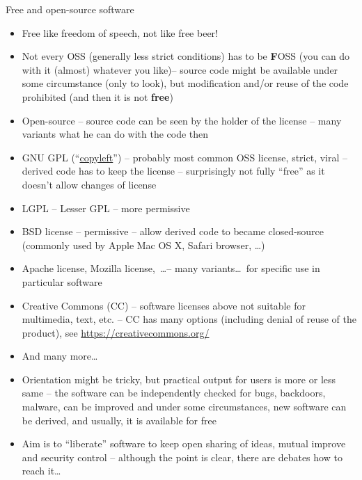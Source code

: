 \documentclass[compress, ucs, xelatex, 11pt, xcolor=svgnames,
  hyperref={
    bookmarks=true,
    unicode=true,
    colorlinks=true,
    pdftitle={Linux, command line and MetaCentrum},
    plainpages=false,
    pdfauthor={Vojtech Zeisek},
    pdfsubject={Course about use of Linux command line, writing shell scripts and using MetaCentrum of CESNET},
    pdfcreator={XeLaTeX},
    pdfkeywords={Linux, GNU, BASH, shell, command line, MetaCentrum},
    linkcolor=Red,
    anchorcolor=Blue,
    citecolor=Purple,
    filecolor=DodgerBlue,
    menucolor=DarkOrchid,
    urlcolor=DeepSkyBlue,
    pdftex},
  url={hyphens, lowtilde} %
  ]{beamer}
\begin{document}
\begin{frame}[allowframebreaks]{Free and open-source software}
\begin{itemize}
  \item Free like freedom of speech, \alert{not} like free beer!
  \item Not every OSS (generally less strict conditions) has to be \textbf{F}OSS (you can do with it (almost) whatever you like)-- source code might be available under some circumstance (only to look), but modification and/or reuse of the code prohibited (and then it is not \textbf{free})
  \item Open-source -- source code can be seen by the holder of the license -- many variants what he can do with the code then
  \item GNU GPL (``\href{https://www.gnu.org/copyleft/}{copyleft}'') -- probably most common OSS license, strict, viral -- derived code has to keep the license -- surprisingly not fully ``free'' as it doesn't allow changes of license
  \item LGPL -- Lesser GPL -- more permissive
  \item BSD license -- permissive -- allow derived code to became closed-source (commonly used by Apple Mac OS X, Safari browser, \ldots)
  \item Apache license, Mozilla license,~\ldots -- many variants\ldots~for specific use in particular software
  \item Creative Commons (CC) -- software licenses above not suitable for multimedia, text, etc. -- CC has many options (including denial of reuse of the product), see \url{https://creativecommons.org/}
  \item And many more\ldots
  \item Orientation might be tricky, but practical output for users is more or less same -- the software can be independently checked for bugs, backdoors, malware, can be improved and under some circumstances, new software can be derived, and usually, it is available for free
  \item Aim is to ``liberate'' software to keep open sharing of ideas, mutual improve and security control -- although the point is clear, there are debates how to reach it\ldots
\end{itemize}
\end{frame}
\end{document}
